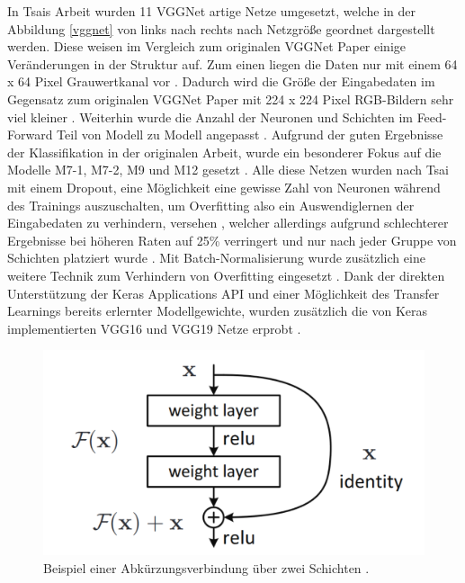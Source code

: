 \documentclass[twoside,a4paper]{IEEEtran}
\begin{document}
In Tsais Arbeit wurden 11 VGGNet artige Netze umgesetzt, welche in der Abbildung \ref{vggnet} von links nach rechts nach Netzgröße geordnet dargestellt werden. Diese weisen im Vergleich zum originalen VGGNet Paper einige Veränderungen in der Struktur auf. Zum einen liegen die Daten nur mit einem 64 x 64 Pixel Grauwertkanal vor \cite[S.3]{RHC}. Dadurch wird die Größe der Eingabedaten im Gegensatz zum originalen VGGNet Paper mit 224 x 224 Pixel RGB-Bildern sehr viel kleiner \cite[S.2]{simonyan2015deep}. Weiterhin wurde die Anzahl der Neuronen und Schichten im Feed-Forward Teil von Modell zu Modell angepasst \cite[S.3]{RHC}. Aufgrund der guten Ergebnisse der Klassifikation in der originalen Arbeit, wurde ein besonderer Fokus auf die Modelle M7-1, M7-2, M9 und M12 gesetzt \cite[S.5]{RHC}. Alle diese Netzen wurden nach Tsai mit einem Dropout, eine Möglichkeit eine gewisse Zahl von Neuronen während des Trainings auszuschalten, um Overfitting also ein Auswendiglernen der Eingabedaten zu verhindern, versehen \cite[S.306-307]{MACHINE_LEARNING}, welcher allerdings aufgrund schlechterer Ergebnisse bei höheren Raten auf 25\% verringert und nur nach jeder Gruppe von Schichten platziert wurde \cite[S.2]{RHC}. Mit Batch-Normalisierung wurde zusätzlich eine weitere Technik zum Verhindern von Overfitting eingesetzt \cite[S.282-283]{MACHINE_LEARNING}. Dank der direkten Unterstützung der Keras Applications API und einer Möglichkeit des Transfer Learnings bereits erlernter Modellgewichte, wurden zusätzlich die von Keras implementierten VGG16 und VGG19 Netze erprobt \cite{vgg_keras}.

\begin{figure}[!htb]
	\includegraphics[width=\columnwidth]{residual}
	\caption{Beispiel einer Abkürzungsverbindung über zwei Schichten \cite[S.2]{resnet}.}
	\label{res}
\end{figure}
\end{document}
